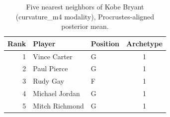 \begin{table}[htbp]
  \centering\small
  \begin{tabular}{rllc}
    \toprule
    Rank & Player & Position & Archetype \\
    \midrule
    1 & Vince Carter & G & 1 \\
    2 & Paul Pierce & G & 1 \\
    3 & Rudy Gay & F & 1 \\
    4 & Michael Jordan & G & 1 \\
    5 & Mitch Richmond & G & 1 \\
    \bottomrule
  \end{tabular}
  \caption{Five nearest neighbors of Kobe Bryant (curvature_m4 modality), Procrustes-aligned posterior mean.}
  \label{tab:Kobe_Bryant_neighbors_curvature_m4}
\end{table}

